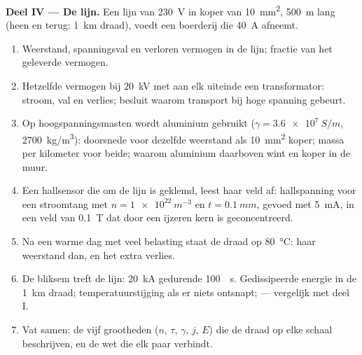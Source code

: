 \begin{problem}
\medskip
\noindent\textbf{Deel IV --- De lijn.}
Een lijn van \qty{230}{V} in koper van \qty{10}{mm^2}, \qty{500}{m} lang
(heen en terug: \qty{1}{km} draad), voedt een boerderij die \qty{40}{A}
afneemt.
\begin{enumerate}[resume]
  \item Weerstand, spanningsval en verloren vermogen in de lijn; fractie van
        het geleverde vermogen.
  \item Hetzelfde vermogen bij \qty{20}{kV} met aan elk uiteinde een
        transformator: stroom, val en verlies; besluit waarom transport bij
        hoge spanning gebeurt.
  \item Op hoogspanningsmasten wordt aluminium gebruikt
        ($\gamma = \qty{3.6e7}{S/m}$, \qty{2700}{kg/m^3}): doorsnede voor
        dezelfde weerstand als \qty{10}{mm^2} koper; massa per kilometer
        voor beide; waarom aluminium daarboven wint en koper in de muur.
  \item Een hallsensor die om de lijn is geklemd, leest haar veld af:
        hallspanning voor een stroomtang met $n = \qty{1e22}{m^{-3}}$ en
        $t = \qty{0.1}{mm}$, gevoed met \qty{5}{mA}, in een veld van
        \qty{0.1}{T} dat door een ijzeren kern is geconcentreerd.
  \item Na een warme dag met veel belasting staat de draad op
        \qty{80}{\degreeCelsius}: haar weerstand dan, en het extra verlies.
  \item De bliksem treft de lijn: \qty{20}{kA} gedurende \qty{100}{\micro
        s}. Gedissipeerde energie in de \qty{1}{km} draad;
        temperatuurstijging als er niets ontsnapt;  ---
        vergelijk met deel I.
  \item Vat samen: de vijf grootheden ($n$, $\tau$, $\gamma$, $j$, $E$) die
        de draad op elke schaal beschrijven, en de wet die elk paar
        verbindt.
\end{enumerate}
\end{problem}
